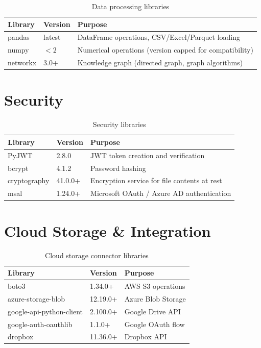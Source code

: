 \documentclass[12pt, a4paper, oneside]{report}
\begin{document}
\begin{table}[H]
\centering
{}
\begin{tabularx}{\linewidth}{llX}
\toprule
\rowcolor{rapidblue!10}
\textbf{Library} & \textbf{Version} & \textbf{Purpose} \\
\midrule
pandas & latest & DataFrame operations, CSV/Excel/Parquet loading \\
numpy & $< 2$ & Numerical operations (version capped for compatibility) \\
networkx & 3.0+ & Knowledge graph (directed graph, graph algorithms) \\
\bottomrule
\end{tabularx}
\caption{Data processing libraries}
\end{table}

\section{Security}

\begin{table}[H]
\centering
{}
\begin{tabularx}{\linewidth}{llX}
\toprule
\rowcolor{rapidblue!10}
\textbf{Library} & \textbf{Version} & \textbf{Purpose} \\
\midrule
PyJWT & 2.8.0 & JWT token creation and verification \\
bcrypt & 4.1.2 & Password hashing \\
cryptography & 41.0.0+ & Encryption service for file contents at rest \\
msal & 1.24.0+ & Microsoft OAuth / Azure AD authentication \\
\bottomrule
\end{tabularx}
\caption{Security libraries}
\end{table}

\section{Cloud Storage \& Integration}

\begin{table}[H]
\centering
{}
\begin{tabularx}{\linewidth}{llX}
\toprule
\rowcolor{rapidblue!10}
\textbf{Library} & \textbf{Version} & \textbf{Purpose} \\
\midrule
boto3 & 1.34.0+ & AWS S3 operations \\
azure-storage-blob & 12.19.0+ & Azure Blob Storage \\
google-api-python-client & 2.100.0+ & Google Drive API \\
google-auth-oauthlib & 1.1.0+ & Google OAuth flow \\
dropbox & 11.36.0+ & Dropbox API \\
\bottomrule
\end{tabularx}
\caption{Cloud storage connector libraries}
\end{table}
\end{document}
